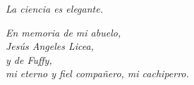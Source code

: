 \thispagestyle{empty}


{\raggedleft \itshape La ciencia es elegante.\par}

\vspace{2cm}

{\raggedleft \itshape En memoria de mi abuelo,\\
Jesús Angeles Licea,\\[0.3cm]
y de Fuffy,\\
mi eterno y fiel compañero, mi cachiperro.\par}


\clearpage
